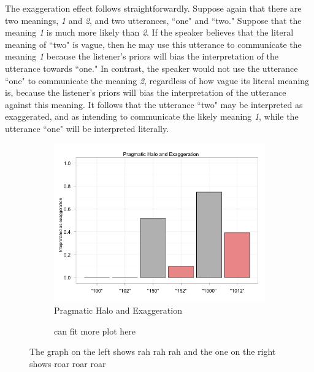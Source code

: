 \documentclass{article} %
\begin{document}
The exaggeration effect follows straightforwardly. Suppose again that there are two meanings, \emph{1} and \emph{2}, and two utterances, ``one" and ``two." Suppose that the meaning \emph{1} is much more likely than \emph{2}. If the speaker believes that the literal meaning of ``two" is vague, then he may use this utterance to communicate the meaning \emph{1} because the listener's priors will bias the interpretation of the utterance towards ``one." In contrast, the speaker would not use the utterance ``one" to communicate the meaning \emph{2}, regardless of how vague its literal meaning is, because the listener's priors will bias the interpretation of the utterance against this meaning. It follows that the utterance ``two" may be interpreted as exaggerated, and as intending to communicate the likely meaning \emph{1}, while the utterance ``one" will be interpreted literally.

\begin{figure}
        \begin{subfigure}[b]{0.5\textwidth}
                \centering
                \includegraphics[width=\textwidth]{model_halo_exaggeration.png}
		\caption{Pragmatic Halo and Exaggeration}
	\end{subfigure}
	 \begin{subfigure}[b]{0.33\textwidth}
                \centering
		\caption{can fit more plot here}
	\end{subfigure}
	\caption{The graph on the left shows rah rah rah and the one on the right shows roar roar roar}
\end{figure}
\end{document}
